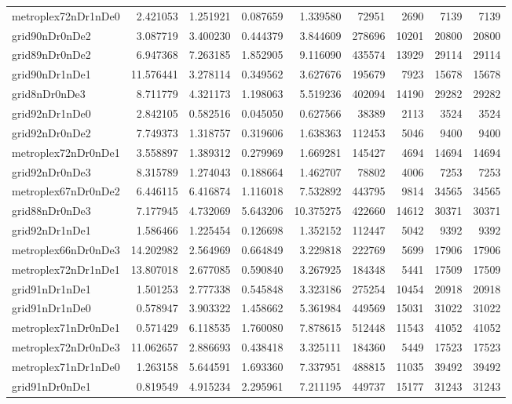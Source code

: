 \begin{longtable}{|l|r|r|r|r|r|r|r|r|}
metroplex72nDr1nDe0 & 2.421053 & 1.251921 & 0.087659 & 1.339580 & 72951 & 2690 & 7139 & 7139 \\
grid90nDr0nDe2 & 3.087719 & 3.400230 & 0.444379 & 3.844609 & 278696 & 10201 & 20800 & 20800 \\
grid89nDr0nDe2 & 6.947368 & 7.263185 & 1.852905 & 9.116090 & 435574 & 13929 & 29114 & 29114 \\
grid90nDr1nDe1 & 11.576441 & 3.278114 & 0.349562 & 3.627676 & 195679 & 7923 & 15678 & 15678 \\
grid8nDr0nDe3 & 8.711779 & 4.321173 & 1.198063 & 5.519236 & 402094 & 14190 & 29282 & 29282 \\
grid92nDr1nDe0 & 2.842105 & 0.582516 & 0.045050 & 0.627566 & 38389 & 2113 & 3524 & 3524 \\
grid92nDr0nDe2 & 7.749373 & 1.318757 & 0.319606 & 1.638363 & 112453 & 5046 & 9400 & 9400 \\
metroplex72nDr0nDe1 & 3.558897 & 1.389312 & 0.279969 & 1.669281 & 145427 & 4694 & 14694 & 14694 \\
grid92nDr0nDe3 & 8.315789 & 1.274043 & 0.188664 & 1.462707 & 78802 & 4006 & 7253 & 7253 \\
metroplex67nDr0nDe2 & 6.446115 & 6.416874 & 1.116018 & 7.532892 & 443795 & 9814 & 34565 & 34565 \\
grid88nDr0nDe3 & 7.177945 & 4.732069 & 5.643206 & 10.375275 & 422660 & 14612 & 30371 & 30371 \\
grid92nDr1nDe1 & 1.586466 & 1.225454 & 0.126698 & 1.352152 & 112447 & 5042 & 9392 & 9392 \\
metroplex66nDr0nDe3 & 14.202982 & 2.564969 & 0.664849 & 3.229818 & 222769 & 5699 & 17906 & 17906 \\
metroplex72nDr1nDe1 & 13.807018 & 2.677085 & 0.590840 & 3.267925 & 184348 & 5441 & 17509 & 17509 \\
grid91nDr1nDe1 & 1.501253 & 2.777338 & 0.545848 & 3.323186 & 275254 & 10454 & 20918 & 20918 \\
grid91nDr1nDe0 & 0.578947 & 3.903322 & 1.458662 & 5.361984 & 449569 & 15031 & 31022 & 31022 \\
metroplex71nDr0nDe1 & 0.571429 & 6.118535 & 1.760080 & 7.878615 & 512448 & 11543 & 41052 & 41052 \\
metroplex72nDr0nDe3 & 11.062657 & 2.886693 & 0.438418 & 3.325111 & 184360 & 5449 & 17523 & 17523 \\
metroplex71nDr1nDe0 & 1.263158 & 5.644591 & 1.693360 & 7.337951 & 488815 & 11035 & 39492 & 39492 \\
grid91nDr0nDe1 & 0.819549 & 4.915234 & 2.295961 & 7.211195 & 449737 & 15177 & 31243 & 31243 \\

\end{longtable}
